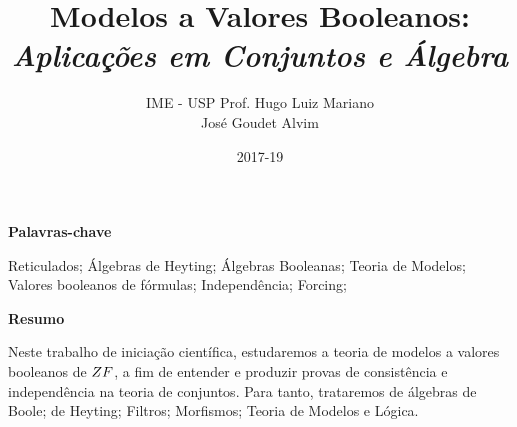 \documentclass[12pt]{report}
\title{{\bf Modelos a Valores Booleanos:}\\ \em Aplicações em Conjuntos e Álgebra}
\author{
    IME - USP
    {\LARGE  Prof.  Hugo Luiz Mariano}\\
                    José Goudet Alvim\\
}
\date{2017-19}
\begin{document}
    \maketitle
    \justify
    \begin{center}{\bf Palavras-chave}\end{center}
        Reticulados; Álgebras de Heyting; Álgebras Booleanas; 
        Teoria de Modelos; Valores booleanos de fórmulas; 
        Independência; Forcing;
    \begin{center}{\bf Resumo}\end{center}
        Neste trabalho de iniciação científica, estudaremos 
        a teoria de modelos a valores booleanos de $\sc ZF$, 
        a fim de entender e produzir provas de consistência 
        e independência na teoria de conjuntos. Para tanto, 
        trataremos de álgebras de Boole; de Heyting; Filtros; 
        Morfismos; Teoria de Modelos e Lógica.
    \cls
    
    \tableofcontents
    \cls
    
    
\end{document}
